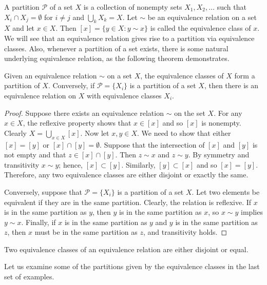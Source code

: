 A {\bfi partition} ${\mathcal P}$ of a set $X$ is a collection of nonempty sets $X_1, X_2, \ldots$ such that $X_i \cap X_j = \emptyset$ for $i  \neq j$ and $\bigcup_k X_k = X$. Let $\sim$ be an equivalence relation on a set $X$ and let $x \in X$.  Then $[x] = \{ y \in X : y \sim x \}$ is called the {\bfi equivalence class\/} of $x$.  We will see that an equivalence relation gives rise to a partition via equivalence classes.  Also, whenever a partition of a set exists, there is some natural  underlying equivalence relation, as the following theorem demonstrates.  
 
\begin{theorem}
Given an equivalence relation $\sim$ on a set $X$, the equivalence classes of $X$ form a partition of $X$.  Conversely, if ${\mathcal P} = \{ X_i\}$ is a partition of a set $X$, then there is an equivalence relation on $X$ with equivalence classes $X_i$. 
\end{theorem}

\begin{proof}
Suppose there exists an equivalence relation $\sim$ on the set $X$.  For any $x \in X$, the reflexive property shows that $x \in [x]$ and so $[x]$ is nonempty.  Clearly $X = \bigcup_{x \in X} [x]$.  Now let $x, y \in X$. We need to show that either $[x] = [y]$ or $[x] \cap [y] = \emptyset$.  Suppose that the intersection of $[x]$ and $[y]$ is not empty and that $z \in [x] \cap [y]$. Then $z \sim x$ and $z \sim y$.  By symmetry and transitivity $x \sim y$; hence, $[x] \subset [y]$.  Similarly, $[y] \subset [x]$ and so $[x] = [y]$.  Therefore, any two equivalence classes are either disjoint or exactly the same.
 
Conversely, suppose that ${\mathcal P} = \{X_i\}$ is a partition of a set $X$.  Let two elements be equivalent if they are in the same partition.  Clearly, the relation is reflexive.  If $x$ is in the same partition as $y$, then $y$ is in the same partition as $x$, so $x \sim y$ implies $y \sim x$.  Finally, if $x$ is in the same partition as $y$ and $y$ is in the same partition as $z$, then $x$ must be in the same partition as $z$, and transitivity holds.
\end{proof}

\begin{corollary}
Two equivalence classes of an equivalence relation are either disjoint or equal.
\end{corollary}
 
Let us examine some of the partitions given by the equivalence classes in the last set of examples. 

